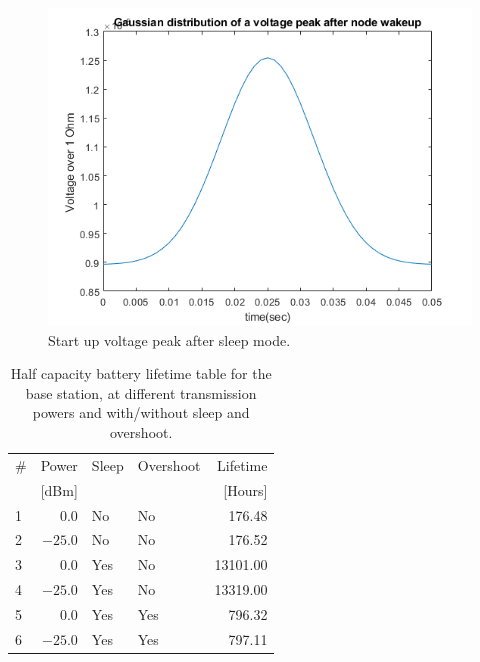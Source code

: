 \begin{figure}[H]
	\centering
	\includegraphics[width=\linewidth]{theory/energyCalculations/fig/gaussianDistributionsOfVoltagePeak.png}
	\caption{Start up voltage peak after sleep mode.}
	\label{fig:gaussianDistributionsOfVoltagePeak}
\end{figure}

\begin{table}[H]
	\centering
	\begin{tabularx}{\linewidth}{|l|r|l|X|r|}
		\hline
		\#	& Power		& Sleep	& Overshoot	& Lifetime	\\
		    & [dBm]		& 		& 		& [Hours]	\\ \hline
		1	& $0.0$		& No	& No	& 176.48	\\ \hline
		2	& $-25.0$	& No	& No	& 176.52	\\ \hline
		3	& $0.0$		& Yes	& No	& 13101.00	\\ \hline
		4	& $-25.0$	& Yes	& No	& 13319.00	\\ \hline
		5	& $0.0$		& Yes	& Yes	& 796.32	\\ \hline
		6	& $-25.0$	& Yes	& Yes	& 797.11	\\ \hline
	\end{tabularx}
	\caption{Half capacity battery lifetime table for the base station, at different transmission powers and with/without sleep and overshoot.}
	\label{tab:halfLifetimeBaseStation}
\end{table}